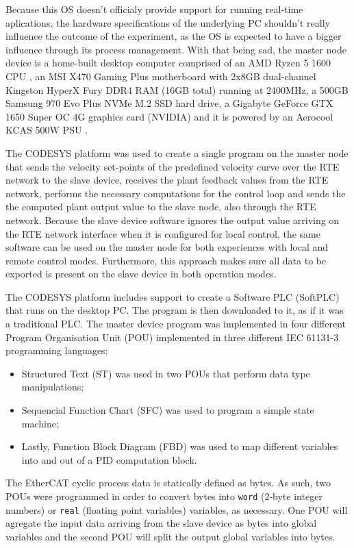 Because this OS doesn't officialy provide support for running real-time aplications, the hardware specifications of the underlying PC shouldn't really influence the outcome of the experiment, as the OS is expected to have a bigger influence through its process management.
With that being sad, the master node device is a home-built desktop computer comprised of an AMD Ryzen\texttrademark{} 5 1600 CPU \cite{hdw:ryzen5-1600}, an MSI X470 Gaming Plus \cite{hdw:msi-x470} motherboard with 2x8GB dual-channel Kingston HyperX Fury DDR4 RAM (16GB total) \cite{hdw:hyperx-fury-8gb-ddr4-2400} running at 2400MHz, a 500GB Samsung 970 Evo Plus NVMe\textregistered{} M.2 SSD \cite{hdw:970evo-plus-ssd} hard drive, a Gigabyte GeForce\textregistered{} GTX 1650 Super\texttrademark{} OC 4G \cite{hdw:gigabyte-1650-super-oc} graphics card (NVIDIA) and it is powered by an Aerocool KCAS 500W PSU \cite{hdw:kcas-500w}.

The CODESYS platform was used to create a single program on the master node that sends the velocity set-points of the predefined velocity curve over the RTE network to the slave device, receives the plant feedback values from the RTE network, performs the necessary computations for the control loop and sends the the computed plant output value to the slave node, also through the RTE network.
Because the slave device software ignores the output value arriving on the RTE network interface when it is configured for local control, the same software can be used on the master node for both experiences with local and remote control modes.
Furthermore, this approach makes sure all data to be exported is present on the slave device in both operation modes.

The CODESYS platform includes support to create a Software PLC (SoftPLC) that runs on the desktop PC.
The program is then downloaded to it, as if it was a traditional PLC.
The master device program was implemented in four different Program Organisation Unit (POU) implemented in three different IEC 61131-3 programming languages: 
\begin{itemize}
	\item Structured Text (ST) was used in two POUs that perform data type manipulations;
	\item Sequencial Function Chart (SFC) was used to program a simple state machine;
	\item Lastly, Function Block Diagram (FBD) was used to map different variables into and out of a PID computation block.
\end{itemize}

The EtherCAT cyclic process data is statically defined as bytes.
As such, two POUs were programmed in order to convert bytes into \verb|word| (2-byte integer numbers) or \verb|real| (floating point variables) variables, as necessary.
One POU will agregate the input data arriving from the slave device as bytes into global variables and the second POU will split the output global variables into bytes.
